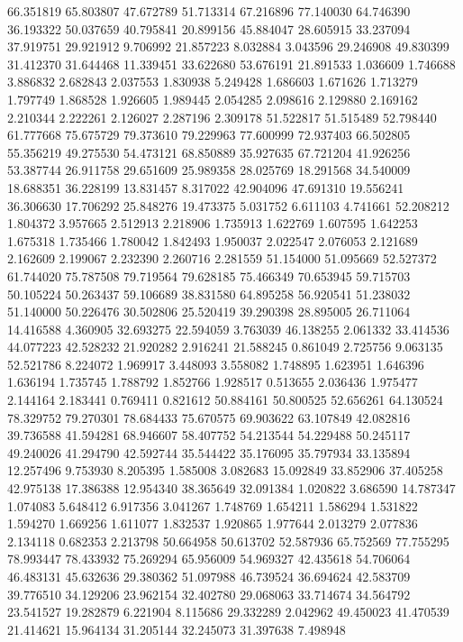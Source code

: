 66.351819
65.803807
47.672789
51.713314
67.216896
77.140030
64.746390
36.193322
50.037659
40.795841
20.899156
45.884047
28.605915
33.237094
37.919751
29.921912
9.706992
21.857223
8.032884
3.043596
29.246908
49.830399
31.412370
31.644468
11.339451
33.622680
53.676191
21.891533
1.036609
1.746688
3.886832
2.682843
2.037553
1.830938
5.249428
1.686603
1.671626
1.713279
1.797749
1.868528
1.926605
1.989445
2.054285
2.098616
2.129880
2.169162
2.210344
2.222261
2.126027
2.287196
2.309178
51.522817
51.515489
52.798440
61.777668
75.675729
79.373610
79.229963
77.600999
72.937403
66.502805
55.356219
49.275530
54.473121
68.850889
35.927635
67.721204
41.926256
53.387744
26.911758
29.651609
25.989358
28.025769
18.291568
34.540009
18.688351
36.228199
13.831457
8.317022
42.904096
47.691310
19.556241
36.306630
17.706292
25.848276
19.473375
5.031752
6.611103
4.741661
52.208212
1.804372
3.957665
2.512913
2.218906
1.735913
1.622769
1.607595
1.642253
1.675318
1.735466
1.780042
1.842493
1.950037
2.022547
2.076053
2.121689
2.162609
2.199067
2.232390
2.260716
2.281559
51.154000
51.095669
52.527372
61.744020
75.787508
79.719564
79.628185
75.466349
70.653945
59.715703
50.105224
50.263437
59.106689
38.831580
64.895258
56.920541
51.238032
51.140000
50.226476
30.502806
25.520419
39.290398
28.895005
26.711064
14.416588
4.360905
32.693275
22.594059
3.763039
46.138255
2.061332
33.414536
44.077223
42.528232
21.920282
2.916241
21.588245
0.861049
2.725756
9.063135
52.521786
8.224072
1.969917
3.448093
3.558082
1.748895
1.623951
1.646396
1.636194
1.735745
1.788792
1.852766
1.928517
0.513655
2.036436
1.975477
2.144164
2.183441
0.769411
0.821612
50.884161
50.800525
52.656261
64.130524
78.329752
79.270301
78.684433
75.670575
69.903622
63.107849
42.082816
39.736588
41.594281
68.946607
58.407752
54.213544
54.229488
50.245117
49.240026
41.294790
42.592744
35.544422
35.176095
35.797934
33.135894
12.257496
9.753930
8.205395
1.585008
3.082683
15.092849
33.852906
37.405258
42.975138
17.386388
12.954340
38.365649
32.091384
1.020822
3.686590
14.787347
1.074083
5.648412
6.917356
3.041267
1.748769
1.654211
1.586294
1.531822
1.594270
1.669256
1.611077
1.832537
1.920865
1.977644
2.013279
2.077836
2.134118
0.682353
2.213798
50.664958
50.613702
52.587936
65.752569
77.755295
78.993447
78.433932
75.269294
65.956009
54.969327
42.435618
54.706064
46.483131
45.632636
29.380362
51.097988
46.739524
36.694624
42.583709
39.776510
34.129206
23.962154
32.402780
29.068063
33.714674
34.564792
23.541527
19.282879
6.221904
8.115686
29.332289
2.042962
49.450023
41.470539
21.414621
15.964134
31.205144
32.245073
31.397638
7.498948
